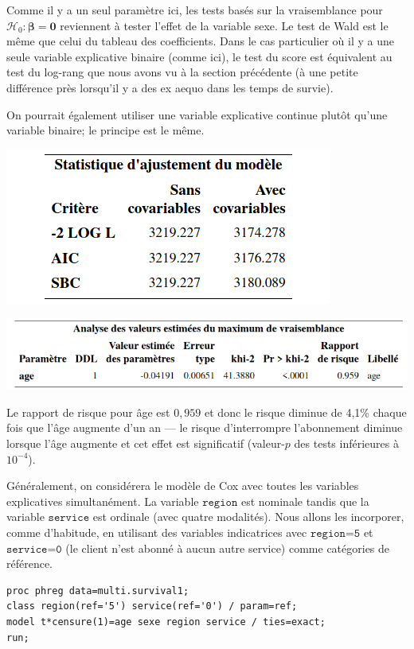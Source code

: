 \documentclass[
  11pt,
  letterpaper,
]{book}
\theoremstyle{definition}
\theoremstyle{definition}
\theoremstyle{definition}
\theoremstyle{remark}
\begin{document}
Comme il y a un seul paramètre ici, les tests basés sur la vraisemblance pour \(\mathcal{H}_0: \boldsymbol{\beta}=\boldsymbol{0}\) reviennent à tester l'effet de la variable sexe. Le test de Wald est le même que celui du tableau des coefficients. Dans le cas particulier où il y a une seule variable explicative binaire (comme ici), le test du score est équivalent au test du log-rang que nous avons vu à la section précédente (à une petite différence près lorsqu'il y a des ex aequo dans les temps de survie).

On pourrait également utiliser une variable explicative continue plutôt qu'une variable binaire; le principe est le même.

\begin{center}\includegraphics[width=0.45\linewidth]{figures/05-survie-e13} \end{center}

\begin{center}\includegraphics[width=0.85\linewidth]{figures/05-survie-e14} \end{center}

Le rapport de risque pour âge est \(0,959\) et donc le risque diminue de 4,1\% chaque fois que l'âge augmente d'un an --- le risque d'interrompre l'abonnement diminue lorsque l'âge augmente et cet effet est significatif (valeur-\(p\) des tests inférieures à \(10^{-4}\)).

Généralement, on considérera le modèle de Cox avec toutes les variables explicatives simultanément. La variable \(\texttt{region}\) est nominale tandis que la variable \(\texttt{service}\) est ordinale (avec quatre modalités). Nous allons les incorporer, comme d'habitude, en utilisant des variables indicatrices avec \(\texttt{region=5}\) et \(\texttt{service=0}\) (le client n'est abonné à aucun autre service) comme catégories de référence.

\begin{verbatim}
proc phreg data=multi.survival1;
class region(ref='5') service(ref='0') / param=ref;
model t*censure(1)=age sexe region service / ties=exact; 
run;
\end{verbatim}
\end{document}
